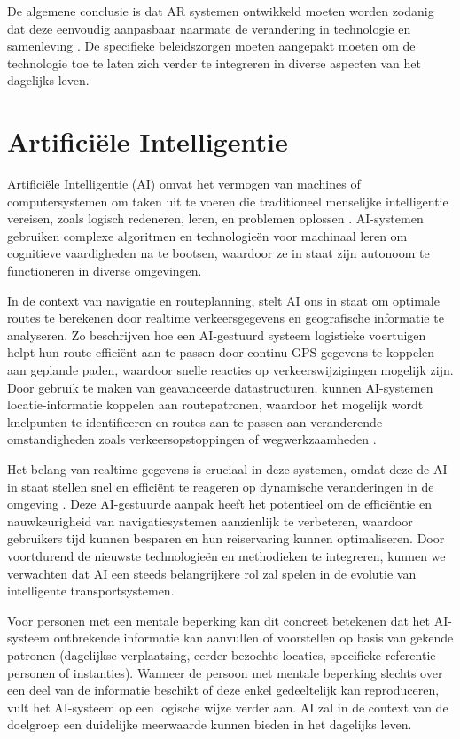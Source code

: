 De algemene conclusie is dat AR systemen ontwikkeld moeten worden zodanig dat deze eenvoudig aanpasbaar naarmate de verandering in technologie en samenleving \autocite{Calo2015}.  De specifieke beleidszorgen moeten aangepakt moeten om de technologie toe te laten zich verder te integreren in diverse aspecten van het dagelijks leven.

\section{Artificiële Intelligentie}
\label{sec:artificiele-intelligentie}

Artificiële Intelligentie (AI) omvat het vermogen van machines of computersystemen om taken uit te voeren die traditioneel menselijke intelligentie vereisen, zoals logisch redeneren, leren, en problemen oplossen \autocite{Sabouret2020}. AI-systemen gebruiken complexe algoritmen en technologieën voor machinaal leren om cognitieve vaardigheden na te bootsen, waardoor ze in staat zijn autonoom te functioneren in diverse omgevingen. 

In de context van navigatie en routeplanning, stelt AI ons in staat om optimale routes te berekenen door realtime verkeersgegevens en geografische informatie te analyseren. Zo beschrijven \textcite{Hu2020} hoe een AI-gestuurd systeem logistieke voertuigen helpt hun route efficiënt aan te passen door continu GPS-gegevens te koppelen aan geplande paden, waardoor snelle reacties op verkeerswijzigingen mogelijk zijn. Door gebruik te maken van geavanceerde datastructuren, kunnen AI-systemen locatie-informatie koppelen aan routepatronen, waardoor het mogelijk wordt knelpunten te identificeren en routes aan te passen aan veranderende omstandigheden zoals verkeersopstoppingen of wegwerkzaamheden \autocite{Soni2023a,Ruta2010}. 

Het belang van realtime gegevens is cruciaal in deze systemen, omdat deze de AI in staat stellen snel en efficiënt te reageren op dynamische veranderingen in de omgeving \autocite{Ciravegna2018}. Deze AI-gestuurde aanpak heeft het potentieel om de efficiëntie en nauwkeurigheid van navigatiesystemen aanzienlijk te verbeteren, waardoor gebruikers tijd kunnen besparen en hun reiservaring kunnen optimaliseren. Door voortdurend de nieuwste technologieën en methodieken te integreren, kunnen we verwachten dat AI een steeds belangrijkere rol zal spelen in de evolutie van intelligente transportsystemen.

Voor personen met een mentale beperking kan dit concreet betekenen dat het AI-systeem ontbrekende informatie kan aanvullen of voorstellen op basis van gekende patronen (dagelijkse verplaatsing, eerder bezochte locaties, specifieke referentie personen of instanties). Wanneer de persoon met mentale beperking slechts over een deel van de informatie beschikt of deze enkel gedeeltelijk kan reproduceren, vult het AI-systeem op een logische wijze verder aan. AI zal in de context van de doelgroep een duidelijke meerwaarde kunnen bieden in het dagelijks leven.

